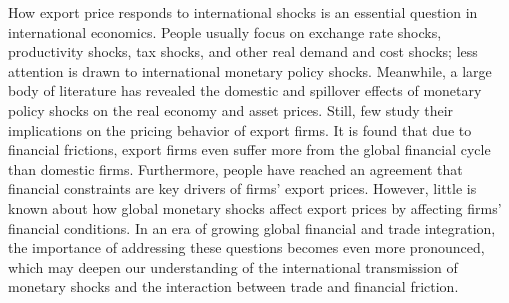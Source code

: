 How export price responds to international shocks is an essential question in international economics. People usually focus on exchange rate shocks, productivity shocks, tax shocks, and other real demand and cost shocks; less attention is drawn to international monetary policy shocks. Meanwhile, a large body of literature has revealed the domestic and spillover effects of monetary policy shocks on the real economy and asset prices. Still, few study their implications on the pricing behavior of export firms. It is found that due to financial frictions, export firms even suffer more from the global financial cycle than domestic firms. Furthermore, people have reached an agreement that financial constraints are key drivers of firms' export prices. However, little is known about how global monetary shocks affect export prices by affecting firms' financial conditions. In an era of growing global financial and trade integration, the importance of addressing these questions becomes even more pronounced, which may deepen our understanding of the international transmission of monetary shocks and the interaction between trade and financial friction.

